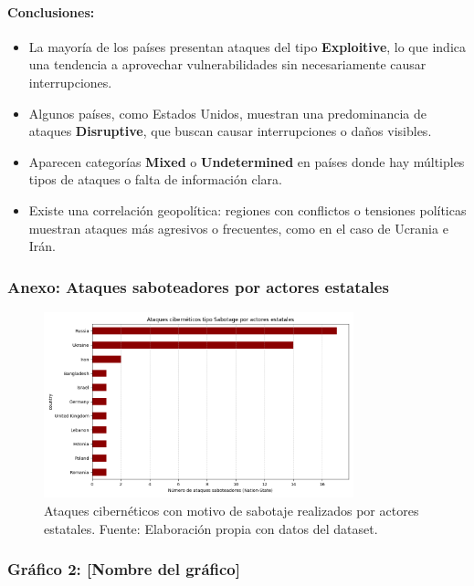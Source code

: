 \documentclass[12pt, a4paper]{article}
\begin{document}
\paragraph{Conclusiones:}
\begin{itemize}
    \item La mayoría de los países presentan ataques del tipo \textbf{Exploitive}, lo que indica una tendencia a aprovechar vulnerabilidades sin necesariamente causar interrupciones.
    \item Algunos países, como Estados Unidos, muestran una predominancia de ataques \textbf{Disruptive}, que buscan causar interrupciones o daños visibles.
    \item Aparecen categorías \textbf{Mixed} o \textbf{Undetermined} en países donde hay múltiples tipos de ataques o falta de información clara.
    \item Existe una correlación geopolítica: regiones con conflictos o tensiones políticas muestran ataques más agresivos o frecuentes, como en el caso de Ucrania e Irán.
\end{itemize}
\subsubsection*{Anexo: Ataques saboteadores por actores estatales}
\begin{figure}[H]
    \centering
    \includegraphics[width=0.8\textwidth]{images/sabotage_state.png}
    \caption{Ataques cibernéticos con motivo de sabotaje realizados por actores estatales. Fuente: Elaboración propia con datos del dataset.}
\end{figure}



\subsubsection*{Gráfico 2: [Nombre del gráfico]}
\begin{figure}[H]
    \
\end{figure}
\end{document}
